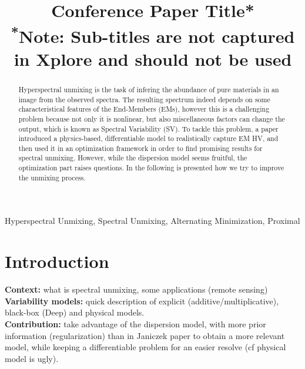 \documentclass[conference]{IEEEtran}
\begin{document}
\title{Conference Paper Title*\\
{\footnotesize \textsuperscript{*}Note: Sub-titles are not captured in Xplore and
should not be used}
}

\author{
\and
{}
}

\maketitle

\begin{abstract}
  Hyperspectral unmixing is the task of infering the abundance of pure materials in an image from the observed spectra. The resulting spectrum indeed depends on some characteristical features of the End-Members (EMs), however this is a challenging problem because not only it is nonlinear, but also miscellaneous factors can change the output, which is known as Spectral Variability (SV). To tackle this problem, a paper~\cite{janiczek_differentiable_2020} introduced a physics-based, differentiable model to realistically capture EM HV, and then used it in an optimization framework in order to find promising results for spectral unmixing. However, while the dispersion model seems fruitful, the optimization part raises questions. In the following is presented how we try to improve the unmixing process.
\end{abstract}

\begin{IEEEkeywords}
Hyperspectral Unmixing, Spectral Unmixing, Alternating Minimization, Proximal
\end{IEEEkeywords}

\section{Introduction}
\textbf{Context:} what is spectral unmixing, some applications (remote sensing)\\
\textbf{Variability models:} quick description of explicit (additive/multiplicative), black-box (Deep) and physical models.\\
\textbf{Contribution:} take advantage of the dispersion model, with more prior information (regularization) than in Janiczek paper to obtain a more relevant model, while keeping a differentiable problem for an easier resolve (cf physical model is ugly).\\
\end{document}
